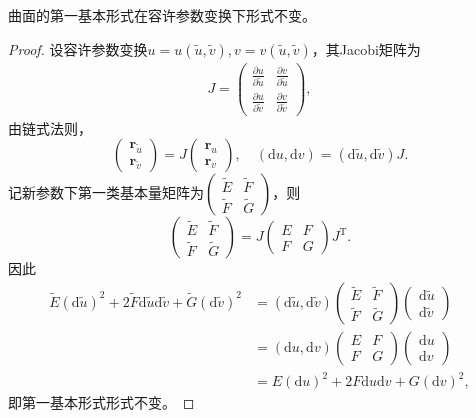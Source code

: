 \documentclass[../../main.tex]{subfiles}%
\begin{document}
\begin{proposition}
曲面的第一基本形式在容许参数变换下形式不变。
\end{proposition}
\begin{proof}
设容许参数变换$u=u(\tilde{u},\tilde{v}),v=v(\tilde{u},\tilde{v})$，其Jacobi矩阵为
\begin{align}
J=\begin{pmatrix}
\frac{\partial u}{\partial\tilde{u}}&\frac{\partial v}{\partial\tilde{u}}\\
\frac{\partial u}{\partial\tilde{v}}&\frac{\partial v}{\partial\tilde{v}}
\end{pmatrix},\label{eq:jacobi}
\end{align}
由链式法则，
\[
\begin{pmatrix}\boldsymbol{r}_{\tilde{u}}\\\boldsymbol{r}_{\tilde{v}}\end{pmatrix}=J\begin{pmatrix}\boldsymbol{r}_u\\\boldsymbol{r}_v\end{pmatrix},\quad (\mathrm{d}u,\mathrm{d}v)=(\mathrm{d}\tilde{u},\mathrm{d}\tilde{v})J.
\]
记新参数下第一类基本量矩阵为$\begin{pmatrix}\tilde{E}&\tilde{F}\\\tilde{F}&\tilde{G}\end{pmatrix}$，则
\[
\begin{pmatrix}\tilde{E}&\tilde{F}\\\tilde{F}&\tilde{G}\end{pmatrix}=J\begin{pmatrix}E&F\\F&G\end{pmatrix}J^\mathrm{T}.
\]
因此
\begin{align*}
\tilde{E}(\mathrm{d}\tilde{u})^2+2\tilde{F}\mathrm{d}\tilde{u}\mathrm{d}\tilde{v}+\tilde{G}(\mathrm{d}\tilde{v})^2
&=(\mathrm{d}\tilde{u},\mathrm{d}\tilde{v})\begin{pmatrix}\tilde{E}&\tilde{F}\\\tilde{F}&\tilde{G}\end{pmatrix}\begin{pmatrix}\mathrm{d}\tilde{u}\\\mathrm{d}\tilde{v}\end{pmatrix}\\
&=(\mathrm{d}u,\mathrm{d}v)\begin{pmatrix}E&F\\F&G\end{pmatrix}\begin{pmatrix}\mathrm{d}u\\\mathrm{d}v\end{pmatrix}\\
&=E(\mathrm{d}u)^2+2F\mathrm{d}u\mathrm{d}v+G(\mathrm{d}v)^2,
\end{align*}
即第一基本形式形式不变。
\end{proof}
\end{document}
